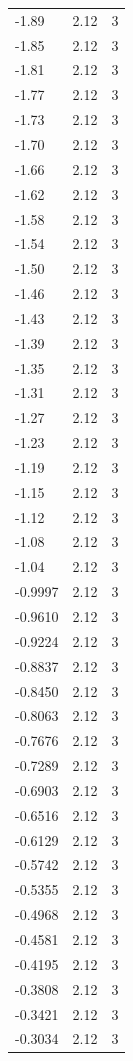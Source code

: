 \begin{longtable}{lrr}
  -1.89 & 2.12 & 3 \\
  -1.85 & 2.12 & 3 \\
  -1.81 & 2.12 & 3 \\
  -1.77 & 2.12 & 3 \\
  -1.73 & 2.12 & 3 \\
  -1.70 & 2.12 & 3 \\
  -1.66 & 2.12 & 3 \\
  -1.62 & 2.12 & 3 \\
  -1.58 & 2.12 & 3 \\
  -1.54 & 2.12 & 3 \\
  -1.50 & 2.12 & 3 \\
  -1.46 & 2.12 & 3 \\
  -1.43 & 2.12 & 3 \\
  -1.39 & 2.12 & 3 \\
  -1.35 & 2.12 & 3 \\
  -1.31 & 2.12 & 3 \\
  -1.27 & 2.12 & 3 \\
  -1.23 & 2.12 & 3 \\
  -1.19 & 2.12 & 3 \\
  -1.15 & 2.12 & 3 \\
  -1.12 & 2.12 & 3 \\
  -1.08 & 2.12 & 3 \\
  -1.04 & 2.12 & 3 \\
  -0.9997 & 2.12 & 3 \\
  -0.9610 & 2.12 & 3 \\
  -0.9224 & 2.12 & 3 \\
  -0.8837 & 2.12 & 3 \\
  -0.8450 & 2.12 & 3 \\
  -0.8063 & 2.12 & 3 \\
  -0.7676 & 2.12 & 3 \\
  -0.7289 & 2.12 & 3 \\
  -0.6903 & 2.12 & 3 \\
  -0.6516 & 2.12 & 3 \\
  -0.6129 & 2.12 & 3 \\
  -0.5742 & 2.12 & 3 \\
  -0.5355 & 2.12 & 3 \\
  -0.4968 & 2.12 & 3 \\
  -0.4581 & 2.12 & 3 \\
  -0.4195 & 2.12 & 3 \\
  -0.3808 & 2.12 & 3 \\
  -0.3421 & 2.12 & 3 \\
  -0.3034 & 2.12 & 3 \\

\end{longtable}
